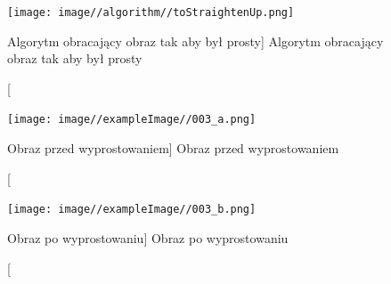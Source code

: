 \documentclass[a4paper,12pt]{article}
\begin{document}
        		 
        		 
        		 
		        \newpage
        		 \begin{figure}[!ht]  
                    \begin{center}
        	    	    \texttt{[image: image//algorithm//toStraightenUp.png]} 
    			    \end{center}
        		    \caption
            			[Algorytm obracający obraz tak aby był prosty]  
            			{Algorytm obracający obraz tak aby był prosty} 
            			\label{fig:straightenUp}
        	    \end{figure}
        		 \newpage
		    
		    
        	
        		\begin{figure}[!ht]  
        		    \begin{center}
        			    \texttt{[image: image//exampleImage//003\_a.png]} 
        		    \end{center}
        		    \caption
        			    [Obraz przed wyprostowaniem]  
            			{Obraz przed wyprostowaniem}  
        	    \end{figure}
        			
                \begin{figure}[!ht]  
        		    \begin{center}
        			    \texttt{[image: image//exampleImage//003\_b.png]} 
        		    \end{center}
        			\caption
            			[Obraz po wyprostowaniu]  
            			{Obraz po wyprostowaniu}  
        	    \end{figure} 
		
		        \newpage 
		 
\end{document}
